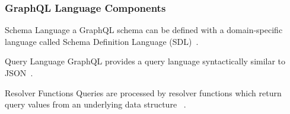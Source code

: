 \begin{frame}\frametitle{GraphQL Language Components}

\begin{block}{Schema Language}
a GraphQL schema can be defined with a domain-specific language called Schema Definition Language (SDL)~\cite{migrating-to-gql,gql-on-graph-db}.
\end{block}

\begin{block}{Query Language}
GraphQL provides a query language syntactically similar to JSON~\cite{gql-on-graph-db,initial-analysis-of-gql}. 
\end{block}

\begin{block}{Resolver Functions}
Queries are processed by resolver functions which return query values from an underlying data structure  ~\cite{migrating-to-gql,real-time-sys-arc-based-on-gql}.
\end{block}

\end{frame}

\begin{frame}
\end{frame}

\begin{frame}



\end{frame}
